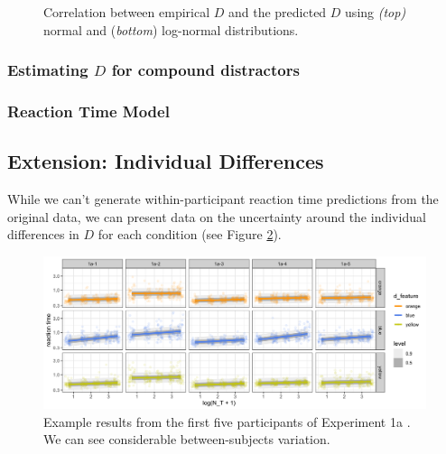 \documentclass[smallextended]{svjour3}       %
\begin{document}
\begin{figure}
\centering
{}
\caption{Correlation between empirical $D$ and the predicted $D$ using \textit{(top)} normal and (\textit{bottom}) log-normal distributions.}
\label{fig:buetti2019_D}
\end{figure}

\subsubsection{Estimating $D$ for compound distractors}

\subsubsection{Reaction Time Model}

\subsection{Extension: Individual Differences}

While we can't generate within-participant reaction time predictions from the original data, we can present data on the uncertainty around the individual differences in $D$ for each condition (see Figure \ref{fig:buetti2019_people}).

\begin{figure}
\centering
\includegraphics[width=\textwidth]{../wd_reanalyse_Buetti2019/exp1_fits.png}
\caption{Example results from the first five participants of Experiment 1a \cite{buetti2019predicting}. We can see considerable between-subjects variation. }
\label{fig:buetti2019_people}
\end{figure}
\end{document}
